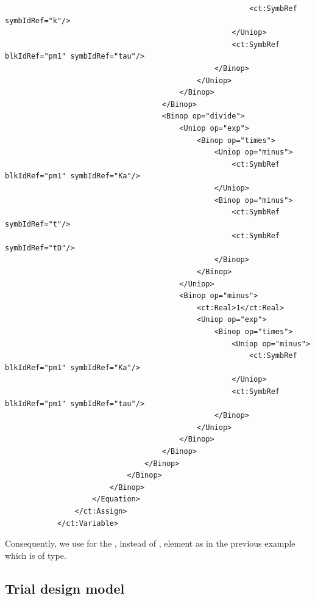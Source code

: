 \begin{lstlisting}
                                                        <ct:SymbRef symbIdRef="k"/>
                                                    </Uniop>
                                                    <ct:SymbRef blkIdRef="pm1" symbIdRef="tau"/>
                                                </Binop>
                                            </Uniop>
                                        </Binop>
                                    </Binop>
                                    <Binop op="divide">
                                        <Uniop op="exp">
                                            <Binop op="times">
                                                <Uniop op="minus">
                                                    <ct:SymbRef blkIdRef="pm1" symbIdRef="Ka"/>
                                                </Uniop>
                                                <Binop op="minus">
                                                    <ct:SymbRef symbIdRef="t"/>
                                                    <ct:SymbRef symbIdRef="tD"/>                                                    
                                                </Binop>
                                            </Binop>
                                        </Uniop>
                                        <Binop op="minus">
                                            <ct:Real>1</ct:Real>
                                            <Uniop op="exp">
                                                <Binop op="times">
                                                    <Uniop op="minus">
                                                        <ct:SymbRef blkIdRef="pm1" symbIdRef="Ka"/>
                                                    </Uniop>
                                                    <ct:SymbRef blkIdRef="pm1" symbIdRef="tau"/>
                                                </Binop>
                                            </Uniop>
                                        </Binop>
                                    </Binop>
                                </Binop>
                            </Binop>
                        </Binop>
                    </Equation>
                </ct:Assign>
            </ct:Variable>
\end{lstlisting}

Consequently, we use for  the , instead of ,
element as in the previous example which is of  type.

\subsection{Trial design model}
